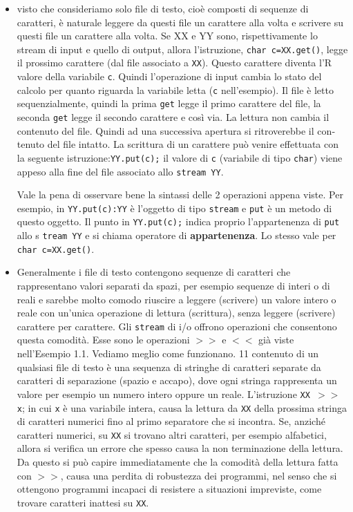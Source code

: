 \documentclass[a4paper,12pt]{book}
\begin{document}
\begin{itemize}
\item visto che consideriamo solo file di testo, cioè composti di sequenze di caratteri, è naturale leggere da questi file un carattere alla volta e scrivere su questi file un carattere alla volta. Se XX e YY sono, rispettivamente lo stream di input e quello di output, allora l'istruzione, \texttt{char c=XX.get()}, legge il prossimo carattere (dal file associato a \texttt{XX}). Questo carattere diventa l'R valore della variabile \texttt{c}. Quindi l'operazione di input cambia lo stato del calcolo per quanto riguarda la variabile letta (\texttt{c} nell'esempio). Il file è letto sequenzialmente, quindi la prima \texttt{get} legge il primo carattere del file, la seconda \texttt{get} legge il secondo carattere e così via. La lettura non cambia il contenuto del file. Quindi ad una successiva apertura si ritroverebbe il con­tenuto del file intatto. La scrittura di un carattere può venire effettuata con la seguente istruzione:\texttt{YY.put(c);} il valore di \texttt{c} (variabile di tipo \texttt{char}) viene appeso alla fine del file associato allo \texttt{stream YY}.

\noindent Vale la pena di osservare bene la sintassi delle 2 operazioni appena viste. Per esempio, in \texttt{YY.put(c):YY} è l'oggetto di tipo \texttt{stream} e \texttt{put} è un metodo di questo oggetto. Il punto in \texttt{YY.put(c);} indica proprio l'appartenenza di \texttt{put} allo s \texttt{tream YY} e si chiama operatore di \textbf{appartenenza}. Lo stesso vale per \texttt{char c=XX.get()}.

\item Generalmente i file di testo contengono sequenze di caratteri che rappresentano valori separati da spazi, per esempio sequenze di interi o di reali e sarebbe molto comodo riuscire a leggere (scrivere) un valore intero o reale con un'unica operazione di lettura (scrittura), senza leggere (scrivere) carattere per carattere. Gli \texttt{stream} di i/o offrono operazioni che consentono questa comodità. Esse sono le operazioni $>>$ e $<<$ già viste nell'Esempio 1.1. Vediamo meglio come funzionano. 11 contenuto di un qualsiasi file di testo è una sequenza di stringhe di caratteri separate da caratteri di separazione (spazio e accapo), dove ogni stringa rappresenta un valore per esempio un numero intero oppure un reale. L'istruzione \texttt{XX $>>$ x}; in cui \texttt{x} è una variabile intera, causa la lettura da \texttt{XX} della prossima stringa di caratteri numerici fino al primo separatore che si incontra. Se, anziché caratteri numerici, su \texttt{XX} si trovano altri caratteri, per esempio alfabetici, allora si verifica un errore che spesso causa la non terminazione della lettura. Da questo si può capire immediatamente che la comodità della lettura fatta con $>>$, causa una perdita di robustezza dei programmi, nel senso che si ottengono programmi incapaci di resistere a situazioni impreviste, come trovare caratteri inattesi su \texttt{XX}.


\end{itemize}
\end{document}
